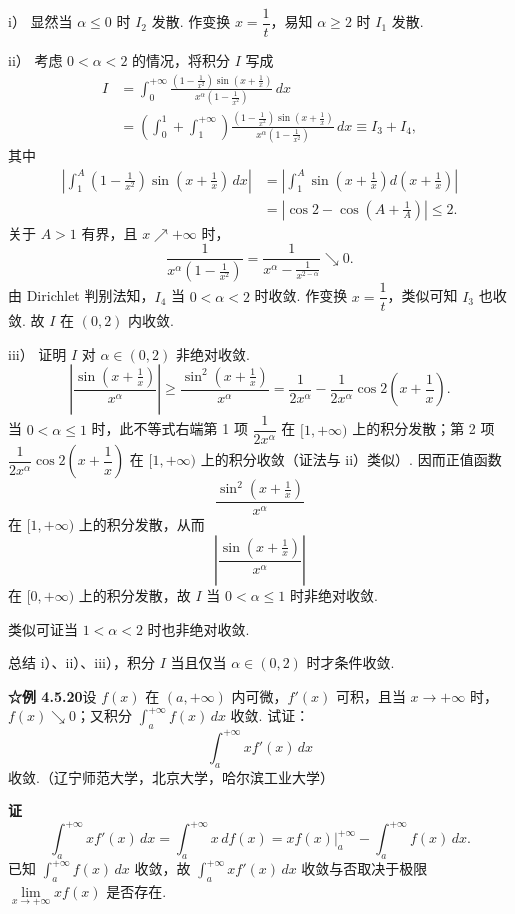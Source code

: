 \documentclass[UTF8, 12pt, fontset=fandol, oneside]{ctexart}
\begin{document}
i） 显然当 $\alpha\le0$ 时 $I_2$ 发散. 作变换 $x=\dfrac1t$，易知 $\alpha\ge2$ 时 $I_1$ 发散.

ii） 考虑 $0<\alpha<2$ 的情况，将积分 $I$ 写成
\[
\begin{aligned}
I&=\int_0^{+\infty}
\frac{\left(1-\frac1{x^2}\right)\sin\left(x+\frac1x\right)}
{x^\alpha\left(1-\frac1{x^2}\right)}\,dx\\
&=\left(\int_0^1+\int_1^{+\infty}\right)
\frac{\left(1-\frac1{x^2}\right)\sin\left(x+\frac1x\right)}
{x^\alpha\left(1-\frac1{x^2}\right)}\,dx
\equiv I_3+I_4,
\end{aligned}
\]
其中
\[
\begin{aligned}
\left|\int_1^A\left(1-\frac1{x^2}\right)
\sin\left(x+\frac1x\right)\,dx\right|
&=\left|\int_1^A\sin\left(x+\frac1x\right)d\left(x+\frac1x\right)\right|\\
&=\left|\cos2-\cos\left(A+\frac1A\right)\right|\le2.
\end{aligned}
\]
关于 $A>1$ 有界，且 $x\nearrow+\infty$ 时，
\[
\frac1{x^\alpha\left(1-\frac1{x^2}\right)}
=\frac1{x^\alpha-\frac1{x^{2-\alpha}}}\searrow0.
\]
由 Dirichlet 判别法知，$I_4$ 当 $0<\alpha<2$ 时收敛. 作变换 $x=\dfrac1t$，类似可知 $I_3$ 也收敛. 故 $I$ 在 $(0,2)$ 内收敛.

iii） 证明 $I$ 对 $\alpha\in(0,2)$ 非绝对收敛.
\[
\left|\frac{\sin\left(x+\frac1x\right)}{x^\alpha}\right|
\ge\frac{\sin^2\left(x+\frac1x\right)}{x^\alpha}
=\frac1{2x^\alpha}-\frac1{2x^\alpha}\cos2\left(x+\frac1x\right).
\]
当 $0<\alpha\le1$ 时，此不等式右端第 1 项 $\dfrac1{2x^\alpha}$ 在 $[1,+\infty)$ 上的积分发散；第 2 项 $\dfrac1{2x^\alpha}\cos2\left(x+\dfrac1x\right)$ 在 $[1,+\infty)$ 上的积分收敛（证法与 ii）类似）. 因而正值函数
\[
\frac{\sin^2\left(x+\frac1x\right)}{x^\alpha}
\]
在 $[1,+\infty)$ 上的积分发散，从而
\[
\left|\frac{\sin\left(x+\frac1x\right)}{x^\alpha}\right|
\]
在 $[0,+\infty)$ 上的积分发散，故 $I$ 当 $0<\alpha\le1$ 时非绝对收敛.

类似可证当 $1<\alpha<2$ 时也非绝对收敛.

总结 i）、ii）、iii），积分 $I$ 当且仅当 $\alpha\in(0,2)$ 时才条件收敛.

\noindent\textbf{☆例 4.5.20}\quad 设 $f(x)$ 在 $(a,+\infty)$ 内可微，$f'(x)$ 可积，且当 $x\to+\infty$ 时，$f(x)\searrow0$；又积分 $\displaystyle\int_a^{+\infty}f(x)\,dx$ 收敛. 试证：
\[
\int_a^{+\infty}xf'(x)\,dx
\]
收敛.（辽宁师范大学，北京大学，哈尔滨工业大学）

\noindent\textbf{证}\quad
\[
\int_a^{+\infty}xf'(x)\,dx
=\int_a^{+\infty}x\,df(x)
=xf(x)\Big|_a^{+\infty}-\int_a^{+\infty}f(x)\,dx.
\]
已知 $\displaystyle\int_a^{+\infty}f(x)\,dx$ 收敛，故 $\displaystyle\int_a^{+\infty}xf'(x)\,dx$ 收敛与否取决于极限 $\lim\limits_{x\to+\infty}xf(x)$ 是否存在.
\end{document}

